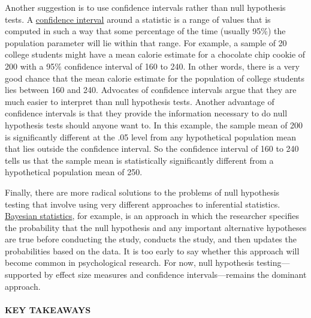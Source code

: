 \documentclass[
]{krantz}
\begin{document}
Another suggestion is to use confidence intervals rather than null hypothesis tests. A \protect\hyperlink{confidence-interval}{confidence interval} around a statistic is a range of values that is computed in such a way that some percentage of the time (usually 95\%) the population parameter will lie within that range. For example, a sample of 20 college students might have a mean calorie estimate for a chocolate chip cookie of 200 with a 95\% confidence interval of 160 to 240. In other words, there is a very good chance that the mean calorie estimate for the population of college students lies between 160 and 240. Advocates of confidence intervals argue that they are much easier to interpret than null hypothesis tests. Another advantage of confidence intervals is that they provide the information necessary to do null hypothesis tests should anyone want to. In this example, the sample mean of 200 is significantly different at the .05 level from any hypothetical population mean that lies outside the confidence interval. So the confidence interval of 160 to 240 tells us that the sample mean is statistically significantly different from a hypothetical population mean of 250.

Finally, there are more radical solutions to the problems of null hypothesis testing that involve using very different approaches to inferential statistics. \protect\hyperlink{bayesian-statistics}{Bayesian statistics}, for example, is an approach in which the researcher specifies the probability that the null hypothesis and any important alternative hypotheses are true before conducting the study, conducts the study, and then updates the probabilities based on the data. It is too early to say whether this approach will become common in psychological research. For now, null hypothesis testing---supported by effect size measures and confidence intervals---remains the dominant approach.

\hypertarget{key-takeaways-40}{%
\paragraph*{KEY TAKEAWAYS}\label{key-takeaways-40}}
\end{document}
